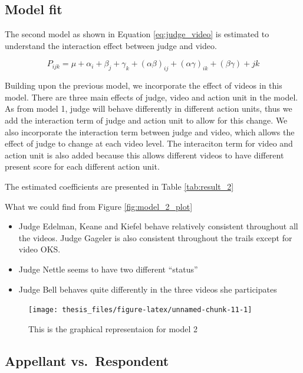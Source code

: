 \documentclass{monashthesis}
\begin{document}
\hypertarget{model-fit-1}{%
\subsection{Model fit}\label{model-fit-1}}

The second model as shown in Equation \ref{eq:judge_video} is estimated to understand the interaction effect between judge and video.

\begin{equation}\label{eq:judge_video}
P_{ijk} = \mu + \alpha_i + \beta_j +\gamma_k + (\alpha\beta)_{ij} + (\alpha\gamma)_{ik} + (\beta\gamma)+{jk}
\end{equation}

Building upon the previous model, we incorporate the effect of videos in this model. There are three main effects of judge, video and action unit in the model. As from model 1, judge will behave differently in different action units, thus we add the interaction term of judge and action unit to allow for this change. We also incorporate the interaction term between judge and video, which allows the effect of judge to change at each video level. The interaciton term for video and action unit is also added because this allows different videos to have different present score for each different action unit.

The estimated coefficients are presented in Table \ref{tab:result_2}

What we could find from Figure \ref{fig:model_2_plot}

\begin{itemize}
\tightlist
\item
  Judge Edelman, Keane and Kiefel behave relatively consistent throughout all the videos. Judge Gageler is also consistent throughout the trails except for video OKS.
\item
  Judge Nettle seems to have two different ``status''
\item
  Judge Bell behaves quite differently in the three videos she participates
\end{itemize}

\begin{figure}
\texttt{[image: thesis\_files/figure-latex/unnamed-chunk-11-1]} \caption{This is the graphical representaion for model 2\label{fig:model_2_plot}}\label{fig:unnamed-chunk-11}
\end{figure}

\hypertarget{appellant-vs.respondent}{%
\subsection{Appellant vs.~Respondent}\label{appellant-vs.respondent}}
\end{document}
